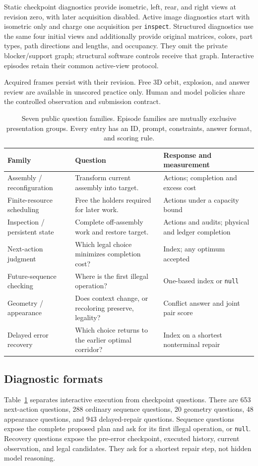 \documentclass[10pt,twocolumn,letterpaper]{article}
\begin{document}
Static checkpoint diagnostics provide isometric, left, rear, and right
views at revision zero, with later acquisition disabled. Active image
diagnostics start with isometric only and charge one acquisition per
\texttt{inspect}. Structured diagnostics use the same four initial views
and additionally provide original matrices, colors, part types, path
directions and lengths, and occupancy. They omit the private
blocker/support graph; structural software controls receive that graph.
Interactive episodes retain their common active-view protocol.

Acquired frames persist with their revision. Free 3D orbit, explosion,
and answer review are available in unscored practice only. Human and
model policies share the controlled observation and submission contract.

\begin{table}[t]
\centering\small
\caption{Seven public question families. Episode families are mutually
exclusive presentation groups. Every entry has an ID, prompt, constraints,
answer format, and scoring rule.}
\begin{tabular}{p{}p{}p{}}\toprule
Family & Question & Response and measurement\\\midrule
Assembly / reconfiguration & Transform current assembly into target. & Actions; completion and excess cost\\
Finite-resource scheduling & Free the holders required for later work. & Actions under a capacity bound\\
Inspection / persistent state & Complete off-assembly work and restore target. & Actions and audits; physical and ledger completion\\
Next-action judgment & Which legal choice minimizes completion cost? & Index; any optimum accepted\\
Future-sequence checking & Where is the first illegal operation? & One-based index or \texttt{null}\\
Geometry / appearance & Does context change, or recoloring preserve, legality? & Conflict answer and joint pair score\\
Delayed error recovery & Which choice returns to the earlier optimal corridor? & Index on a shortest nonterminal repair\\
\bottomrule\end{tabular}
\label{tab:taxonomy}
\end{table}

\subsection{Diagnostic formats}
Table~\ref{tab:taxonomy} separates interactive execution from checkpoint
questions. There are 653 next-action questions, 288 ordinary sequence
questions, 20 geometry questions, 48 appearance questions, and 943
delayed-repair questions. Sequence questions expose the complete proposed
plan and ask for its first illegal operation, or \texttt{null}.
Recovery questions expose the pre-error checkpoint, executed history,
current observation, and legal candidates. They ask for a shortest repair
step, not hidden model reasoning.
\end{document}
